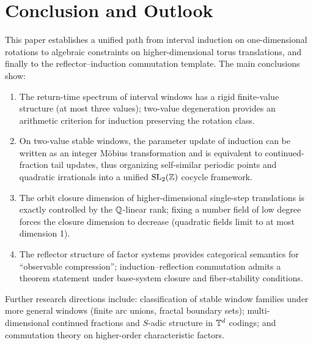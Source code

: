 \section{Conclusion and Outlook}

This paper establishes a unified path from interval induction on one-dimensional rotations to algebraic constraints on higher-dimensional torus translations, and finally to the reflector--induction commutation template. The main conclusions show:
\begin{enumerate}
  \item The return-time spectrum of interval windows has a rigid finite-value structure (at most three values); two-value degeneration provides an arithmetic criterion for induction preserving the rotation class.
  \item On two-value stable windows, the parameter update of induction can be written as an integer Möbius transformation and is equivalent to continued-fraction tail updates, thus organizing self-similar periodic points and quadratic irrationals into a unified $\mathrm{SL}_2(\mathbb{Z})$ cocycle framework.
  \item The orbit closure dimension of higher-dimensional single-step translations is exactly controlled by the $\mathbb{Q}$-linear rank; fixing a number field of low degree forces the closure dimension to decrease (quadratic fields limit to at most dimension 1).
  \item The reflector structure of factor systems provides categorical semantics for ``observable compression''; induction--reflection commutation admits a theorem statement under base-system closure and fiber-stability conditions.
\end{enumerate}

Further research directions include: classification of stable window families under more general windows (finite arc unions, fractal boundary sets); multi-dimensional continued fractions and $S$-adic structure in $\mathbb{T}^d$ codings; and commutation theory on higher-order characteristic factors.
